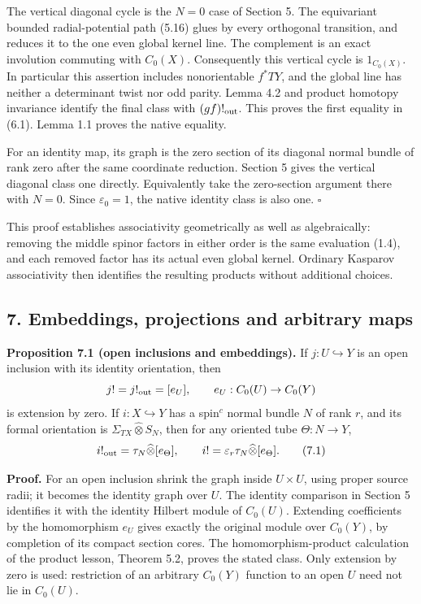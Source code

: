 \documentclass[
  11pt,
]{article}
\begin{document}
The vertical diagonal cycle is the \(N=0\) case of Section 5. The
equivariant bounded radial-potential path (5.16) glues by every
orthogonal transition, and reduces it to the one even global kernel
line. The complement is an exact involution commuting with \(C_0(X)\).
Consequently this vertical cycle is \(1_{C_0(X)}\). In particular this
assertion includes nonorientable \(f^*TY\), and the global line has
neither a determinant twist nor odd parity. Lemma 4.2 and product
homotopy invariance identify the final class with \((gf)!_{\rm out}\).
This proves the first equality in (6.1). Lemma 1.1 proves the native
equality.

For an identity map, its graph is the zero section of its diagonal
normal bundle of rank zero after the same coordinate reduction. Section
5 gives the vertical diagonal class one directly. Equivalently take the
zero-section argument there with \(N=0\). Since \(\varepsilon_0=1\), the
native identity class is also one. \(\square\)

This proof establishes associativity geometrically as well as
algebraically: removing the middle spinor factors in either order is the
same evaluation (1.4), and each removed factor has its actual even
global kernel. Ordinary Kasparov associativity then identifies the
resulting products without additional choices.

\subsection{7. Embeddings, projections and arbitrary
maps}\label{embeddings-projections-and-arbitrary-maps}

\textbf{Proposition 7.1 (open inclusions and embeddings).} If
\(j:U\hookrightarrow Y\) is an open inclusion with its identity
orientation, then \[
 j!=j!_{\rm out}=[e_U],\qquad e_U:C_0(U)\to C_0(Y)
\] is extension by zero. If \(i:X\hookrightarrow Y\) has a spin\(^{c}\)
normal bundle \(N\) of rank \(r\), and its formal orientation is
\(\Sigma_{TX}\widehat\otimes S_N\), then for any oriented tube
\(\Theta:N\to Y\), \[
 i!_{\rm out}=\tau_N\widehat\otimes[e_\Theta],\qquad
 i!=\varepsilon_r\tau_N\widehat\otimes[e_\Theta].
 \tag{7.1}
\]

\textbf{Proof.} For an open inclusion shrink the graph inside
\(U\times U\), using proper source radii; it becomes the identity graph
over \(U\). The identity comparison in Section 5 identifies it with the
identity Hilbert module of \(C_0(U)\). Extending coefficients by the
homomorphism \(e_U\) gives exactly the original module over \(C_0(Y)\),
by completion of its compact section cores. The homomorphism-product
calculation of the product lesson, Theorem 5.2, proves the stated class.
Only extension by zero is used: restriction of an arbitrary \(C_0(Y)\)
function to an open \(U\) need not lie in \(C_0(U)\).
\end{document}
